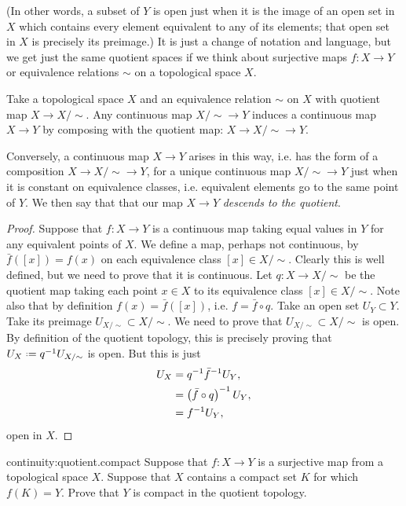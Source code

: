 (In other words, a subset of \(Y\) is open just when it is the image of an open set in \(X\) which contains every element equivalent to any of its elements; that open set in \(X\) is precisely its preimage.)
It is just a change of notation and language, but we get just the same quotient spaces if we think about surjective maps \(f \colon X \to Y\) or equivalence relations \(\sim\) on a topological space \(X\).
\begin{theorem}
Take a topological space \(X\) and an equivalence relation \(\sim\) on \(X\) with quotient map \(X \to X/{\sim}\).
Any continuous map \(X/{\sim} \to Y\) induces a continuous map \(X \to Y\) by composing with the quotient map: \(X \to X/{\sim} \to Y\).

Conversely, a continuous map \(X \to Y\) arises in this way, i.e. has the form of a composition \(X \to X/{\sim} \to Y\), for a unique continuous map \(X/{\sim} \to Y\) just when it is constant on equivalence classes, i.e. equivalent elements go to the same point of \(Y\).
We then say that that our map \(X \to Y\) \emph{descends to the quotient}.
\end{theorem}
\begin{proof}
Suppose that \(f \colon X \to Y\) is a continuous map taking equal values in \(Y\) for any equivalent points of \(X\).
We define a map, perhaps not continuous, by \(\bar{f}([x])=f(x)\) on each equivalence class \([x] \in X/{\sim}\).
Clearly this is well defined, but we need to prove that it is continuous.
Let \(q \colon X \to X/\sim\) be the quotient map taking each point \(x \in X\) to its equivalence class \([x] \in X/\sim\).
Note also that by definition \(f(x)=\bar{f}([x])\), i.e. \(f=\bar{f} \circ q\).
Take an open set \(U_Y \subset Y\).
Take its preimage \(U_{X/{\sim}} \subset X/{\sim}\).
We need to prove that \(U_{X/{\sim}} \subset X/{\sim}\) is open.
By definition of the quotient topology, this is precisely proving that \(U_X \defeq q^{-1}U_{X/{\sim}}\) is open.
But this is just
\begin{align*}
U_X
&=
q^{-1} \bar{f}^{-1} U_Y,
\\
&= \left(\bar{f} \circ q\right)^{-1} U_Y,
\\
&=
f^{-1} U_Y,
\end{align*}
open in \(X\).
\end{proof}
\begin{problem}{continuity:quotient.compact}
Suppose that \(f \colon X \to Y\) is a surjective map from a topological space \(X\).
Suppose that \(X\) contains a compact set \(K\) for which \(f(K)=Y\).
Prove that \(Y\) is compact in the quotient topology.
\end{problem}
